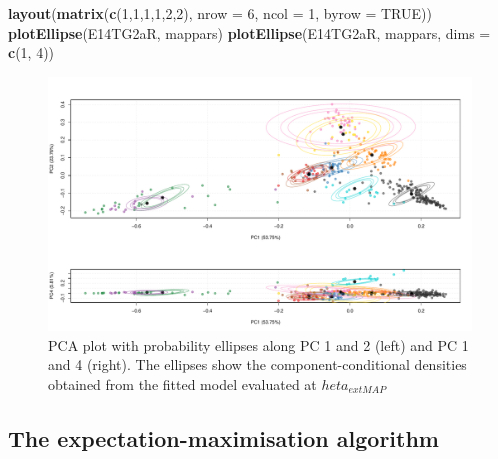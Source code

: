 \documentclass[
]{article}
\newenvironment{Shaded}{\begin{snugshade}}{\end{snugshade}}
\newcommand{\DataTypeTok}[1]{\textcolor[rgb]{0.13,0.29,0.53}{#1}}
\newcommand{\DecValTok}[1]{\textcolor[rgb]{0.00,0.00,0.81}{#1}}
\newcommand{\KeywordTok}[1]{\textcolor[rgb]{0.13,0.29,0.53}{\textbf{#1}}}
\newcommand{\NormalTok}[1]{#1}
\newcommand{\OtherTok}[1]{\textcolor[rgb]{0.56,0.35,0.01}{#1}}
\begin{document}
\begin{Shaded}
\begin{Highlighting}[]
\KeywordTok{layout}\NormalTok{(}\KeywordTok{matrix}\NormalTok{(}\KeywordTok{c}\NormalTok{(}\DecValTok{1}\NormalTok{,}\DecValTok{1}\NormalTok{,}\DecValTok{1}\NormalTok{,}\DecValTok{1}\NormalTok{,}\DecValTok{2}\NormalTok{,}\DecValTok{2}\NormalTok{), }\DataTypeTok{nrow =} \DecValTok{6}\NormalTok{, }\DataTypeTok{ncol =} \DecValTok{1}\NormalTok{, }\DataTypeTok{byrow =} \OtherTok{TRUE}\NormalTok{))}
\KeywordTok{plotEllipse}\NormalTok{(E14TG2aR, mappars)}
\KeywordTok{plotEllipse}\NormalTok{(E14TG2aR, mappars, }\DataTypeTok{dims =} \KeywordTok{c}\NormalTok{(}\DecValTok{1}\NormalTok{, }\DecValTok{4}\NormalTok{))}
\end{Highlighting}
\end{Shaded}

\begin{figure}
\includegraphics[width=1\linewidth]{F1000TAGMworkflow_rev1_files/figure-latex/e14ellipse-1} \caption{PCA plot with probability ellipses along PC 1 and 2 (left) and PC 1 and 4 (right). The ellipses show the component-conditional densities obtained from the fitted model evaluated at $ heta_{  ext{MAP}}$}\label{fig:e14ellipse}
\end{figure}

\hypertarget{the-expectation-maximisation-algorithm}{%
\subsection{The expectation-maximisation
algorithm}\label{the-expectation-maximisation-algorithm}}
\end{document}
